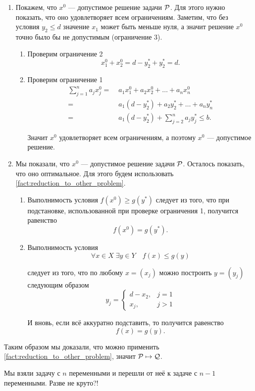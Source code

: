 \begin{enumerate}[nosep]
	\item Покажем, что $x^0$ --- допустимое решение задачи $\P$. Для этого нужно показать, что оно удовлетворяет всем ограничениям. Заметим, что без условия $y_2 \le d$ значение $x_1$ может быть меньше нуля, а значит решение $x^0$ точно было бы не допустимым (ограничение 3).
	
	\begin{enumerate}
		\item Проверим ограничение 2
			\[
				x^0_1 + x^0_2 = d - y^*_2 + y^*_2 = d.
			\]
			
		\item Проверим ограничение 1
			\begin{align*}
				\sum_{j=1}^{n} a_j x^0_j =& \; a_1 x^0_1 + a_2 x^0_2 + \dots + a_n x^0_n \\
				=& \; a_1 (d - y^*_2) + a_2 y^*_2 + \dots + a_n y^*_n \\
				=& \; a_1 (d-y^*_2) + \sum_{j=2}^{n}a_j y^*_j \le b.
			\end{align*}
		
			Значит $x^0$ удовлетворяет всем ограничениям, а поэтому $x^0$ --- допустимое решение.	
	\end{enumerate}
	
	\item Мы показали, что $x^0$ --- допустимое решение задачи $\P$. Осталось показать, что оно оптимальное. Для этого будем использовать \cref{fact:reduction_to_other_problem}.
		
		\begin{enumerate}
			\item Выполнимость условия $f(x^0) \ge g(y^*)$ следует из того, что при подстановке, использованной при проверке ограничения 1, получится равенство
			\[
				f(x^0) = g(y^*).
			\]
			
			\item Выполнимость условия
			\[
				\forall x \in X \; \exists y \in Y \quad f(x) \le g(y)
			\]
			
			следует из того, что по любому $x = (x_j)$ можно построить $y = (y_j)$ следующим образом
			\[
				y_j = \begin{cases}
					d - x_2,& j = 1 \\
					x_j,& j > 1
				\end{cases}
			\]
		
			И вновь, если всё аккуратно подставить, то получится равенство
			\[
				f(x) = g(y).
			\]
		\end{enumerate}
\end{enumerate}

Таким образом мы доказали, что можно применить \cref{fact:reduction_to_other_problem}, значит $\P \mapsto \Q$.

Мы взяли задачу с $n$ переменными и перешли от неё к задаче с $n-1$ переменными. Разве не круто?!
